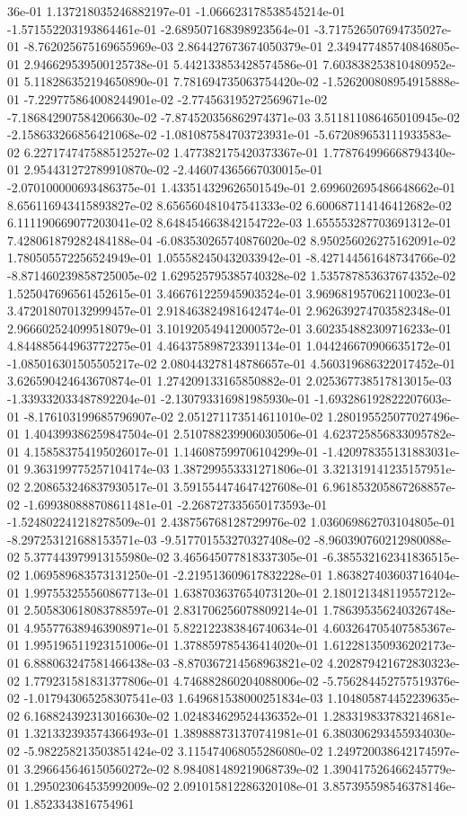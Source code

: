 36e-01	1.137218035246882197e-01	-1.066623178538545214e-01	-1.571552203193864461e-01	-2.689507168398923564e-01	-3.717526507694735027e-01	-8.762025675169655969e-03	2.864427673674050379e-01	2.349477485740846805e-01	2.946629539500125738e-01	5.442133853428574586e-01	7.603838253810480952e-01	5.118286352194650890e-01	7.781694735063754420e-02	-1.526200808954915888e-01	-7.229775864008244901e-02	-2.774563195272569671e-02	-7.186842907584206630e-02	-7.874520356862974371e-03	3.511811086465010945e-02	-2.158633266856421068e-02	-1.081087584703723931e-01	-5.672089653111933583e-02	6.227174747588512527e-02	1.477382175420373367e-01	1.778764996668794340e-01	2.954431272789910870e-02	-2.446074365667030015e-01	-2.070100000693486375e-01	1.433514329626501549e-01	2.699602695486648662e-01	8.656116943415893827e-02	8.656560481047541333e-02	6.600687114146412682e-02	6.111190669077203041e-02	8.648454663842154722e-03	1.655553287703691312e-01	7.428061879282484188e-04	-6.083530265740876020e-02	8.950256026275162091e-02	1.780505572256524949e-01	1.055582450432033942e-01	-8.427144561648734766e-02	-8.871460239858725005e-02	1.629525795385740328e-02	1.535787853637674352e-02	1.525047696561452615e-01	3.466761225945903524e-01	3.969681957062110023e-01	3.472018070132999457e-01	2.918463824981642474e-01	2.962639274703582348e-01	2.966602524099518079e-01	3.101920549412000572e-01	3.602354882309716233e-01	4.844885644963772275e-01	4.464375898723391134e-01	1.044246670906635172e-01	-1.085016301505505217e-02	2.080443278148786657e-01	4.560319686322017452e-01	3.626590424643670874e-01	1.274209133165850882e-01	2.025367738517813015e-03	-1.339332033487892204e-01	-2.130793316981985930e-01	-1.693286192822207603e-01	-8.176103199685796907e-02	2.051271173514611010e-02	1.280195525077027496e-01	1.404399386259847504e-01	2.510788239906030506e-01	4.623725856833095782e-01	4.158583754195026017e-01	1.146087599706104299e-01	-1.420978355131883031e-01	9.363199775257104174e-03	1.387299553331271806e-01	3.321319141235157951e-02	2.208653246837930517e-01	3.591554474647427608e-01	6.961853205867268857e-02	-1.699380888708611481e-01	-2.268727335650173593e-01	-1.524802241218278509e-01	2.438756768128729976e-02	1.036069862703104805e-01	-8.297253121688153571e-03	-9.517701553270327408e-02	-8.960390760212980088e-02	5.377443979913155980e-02	3.465645077818337305e-01	-6.385532162341836515e-02	1.069589683573131250e-01	-2.219513609617832228e-01	1.863827403603716404e-01	1.997553255560867713e-01	1.638703637654073120e-01	2.180121348119557212e-01	2.505830618083788597e-01	2.831706256078809214e-01	1.786395356240326748e-01	4.955776389463908971e-01	5.822122383846740634e-01	4.603264705407585367e-01	1.995196511923151006e-01	1.378859785436414020e-01	1.612281350936202173e-01	6.888063247581466438e-03	-8.870367214568963821e-02	4.202879421672830323e-02	1.779231581831377806e-01	4.746882860204088006e-02	-5.756284452757519376e-02	-1.017943065258307541e-03	1.649681538000251834e-03	1.104805874452239635e-02	6.168824392313016630e-02	1.024834629524436352e-01	1.283319833783214681e-01	1.321332393574366493e-01	1.389888731370741981e-01	6.380306293455934030e-02	-5.982258213503851424e-02	3.115474068055286080e-02	1.249720038642174597e-01	3.296645646150560272e-02	8.984081489219068739e-02	1.390417526466245779e-01	1.295023064535992009e-02	2.091015812286320108e-01	3.857395598546378146e-01	1.8523343816754961